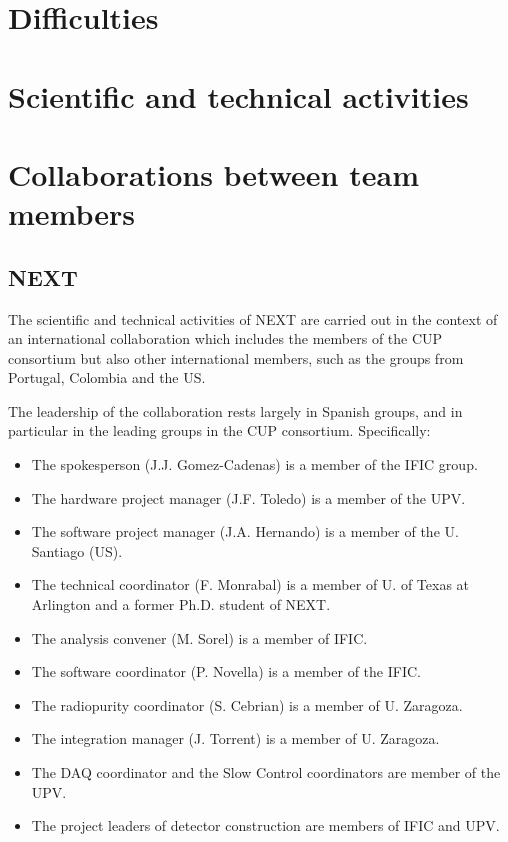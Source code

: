 \documentclass[a4paper,11pt,oneside]{article}
\begin{document}
\section{\bf \textsf{ Difficulties}} 
\label{sec.diff}


\section{\bf \textsf{ Scientific and technical activities }} 
\label{sec.science}


\section{\bf \textsf{Collaborations between team members}}
\label{sec.coll}

\subsection*{NEXT}

The scientific and technical activities of NEXT are carried out in the context of an international collaboration which includes the members of the CUP consortium but also other international members, such as the groups from Portugal, Colombia and the US. 

The leadership of the collaboration rests largely in Spanish groups, and in particular in the leading groups in the CUP consortium. Specifically:

\begin{itemize}
\item The spokesperson (J.J. Gomez-Cadenas) is a member of the IFIC group.
\item The hardware project manager (J.F. Toledo) is a member of the UPV.
\item The software project manager (J.A. Hernando) is a member of the U. Santiago (US).
\item The technical coordinator (F. Monrabal) is a member of U. of Texas at Arlington and a former Ph.D. student of NEXT.
\item The analysis convener (M. Sorel) is a member of IFIC.
\item The software coordinator (P. Novella) is a member of the IFIC. 
\item The radiopurity coordinator (S. Cebrian) is a member of U. Zaragoza.
\item The integration manager (J. Torrent) is a member of U. Zaragoza.
\item The DAQ coordinator and the Slow Control coordinators are member of the UPV.
\item The project leaders of detector construction are members of IFIC and UPV.
\end{itemize}
\end{document}
